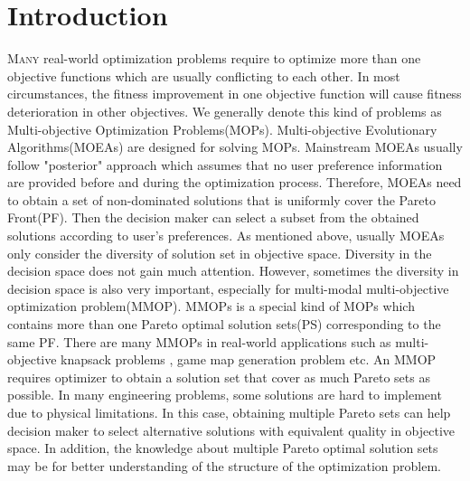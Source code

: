 \documentclass[conference]{IEEEtran}
\begin{document}
\section{Introduction}
\lettrine[lines=2]{M}{any} real-world optimization problems require to optimize more than one objective functions which are usually conflicting to each other. In most circumstances, the fitness improvement in one objective function will cause fitness deterioration in other objectives. We generally denote this kind of problems as Multi-objective Optimization Problems(MOPs). Multi-objective Evolutionary Algorithms(MOEAs) are designed for solving MOPs. Mainstream MOEAs usually follow "posterior" approach which assumes that no user preference information are provided before and during the optimization process. Therefore, MOEAs need to obtain a set of non-dominated solutions that is uniformly cover the Pareto Front(PF). Then the decision maker can select a subset from the obtained solutions according to user's preferences. As mentioned above, usually MOEAs only consider the diversity of solution set in objective space. Diversity in the decision space does not gain much attention. However, sometimes the diversity in decision space is also very important, especially for multi-modal multi-objective optimization problem(MMOP). MMOPs is a special kind of MOPs which contains more than one Pareto optimal solution sets(PS) corresponding to the same PF. There are many MMOPs in real-world applications such as multi-objective knapsack problems \cite{Jaszkiewicz2002}, game map generation problem \cite{Togelius} etc. An MMOP requires optimizer to obtain a solution set that cover as much Pareto sets as possible. In many engineering problems, some solutions are hard to implement due to physical limitations. In this case, obtaining multiple Pareto sets can help decision maker to select alternative solutions with equivalent quality in objective space. In addition, the knowledge about multiple Pareto optimal solution sets may be for better understanding of the structure of the optimization problem\cite{Deb2001}.
\end{document}
